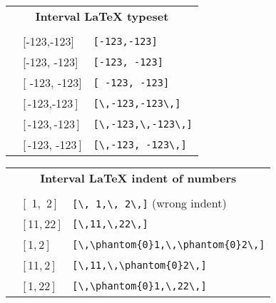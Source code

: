 \documentclass{article}
\begin{document}
\begin{tabular}[t]{lll}
  \multicolumn{3}{c}{\textbf{Interval LaTeX typeset}} \\ \\
  & [-123,-123]       & \verb*|[-123,-123]| \\
  & [-123, -123]      & \verb*|[-123, -123]| \\
  & [ -123, -123]     & \verb*|[ -123, -123]| \\
  & [\,-123,-123\,]   & \verb*|[\,-123,-123\,]| \\
  & [\,-123,\,-123\,] & {\color{red} \verb*|[\,-123,\,-123\,]|} \\
  & [\,-123, -123\,]  & \verb*|[\,-123, -123\,]| \\
\end{tabular}
\quad
\begin{tabular}[t]{lll}
  \multicolumn{3}{c}{\textbf{Interval LaTeX indent of numbers}} \\ \\
  & [\, 1,\, 2\,]                     & \verb*|[\, 1,\, 2\,]| \quad (wrong indent) \\
  & [\,11,\,22\,]                     & \verb*|[\,11,\,22\,]| \\
  & [\,\phantom{0}1,\,\phantom{0}2\,] & \verb*|[\,\phantom{0}1,\,\phantom{0}2\,]| \\
  & [\,11,\,\phantom{0}2\,]           & \verb*|[\,11,\,\phantom{0}2\,]| \\
  & [\,\phantom{0}1,\,22\,]           & \verb*|[\,\phantom{0}1,\,22\,]| \\
\end{tabular}
\end{document}
